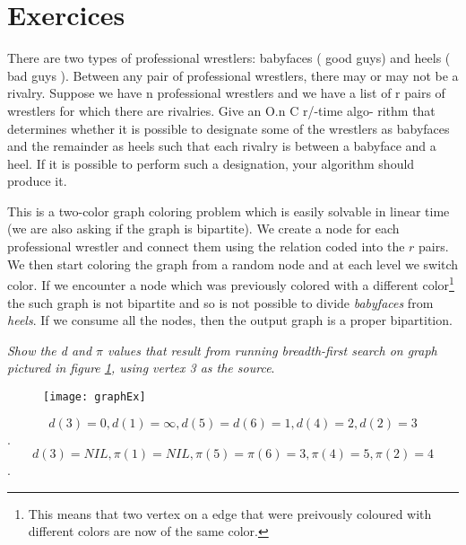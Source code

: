 \section{Exercices}
\begin{problem}
There are two types of professional wrestlers:  babyfaces  ( good guys) and
heels ( bad guys ). Between any pair of professional wrestlers, there may or
may not be a rivalry. Suppose we have n professional wrestlers and we have a list
of r pairs of wrestlers for which there are rivalries. Give an O.n C r/-time algo-
rithm that determines whether it is possible to designate some of the wrestlers as
babyfaces and the remainder as heels such that each rivalry is between a babyface
and a heel. If it is possible to perform such a designation, your algorithm should
produce it.
\begin{solution}
This is a two-color graph coloring problem which is easily solvable in linear time (we are also asking if the graph is bipartite).
We create a node for each professional wrestler and connect them using the relation coded into the $r$ pairs. We then start coloring the graph from a random node and at each level we switch color. If we encounter a node which was previously colored with a different color\footnote{This means that two vertex on a edge that were preivously coloured with different colors are now of the same color.} the such graph is not bipartite and so is not possible to divide \textit{babyfaces} from \textit{heels}. If we consume all the nodes, then the output graph is a proper bipartition.
\end{solution}


\end{problem}



\begin{problem}
\textit{Show the d and $\pi$ values that result from running breadth-first search on graph pictured in figure \ref{fig:graphex}, using vertex 3 as the source}.


	\begin{figure}
	\label{fig:graphex}
	\centering
		\texttt{[image: graphEx]}
	\end{figure}
\begin{solution}
\[d(3) = 0 , d(1) = \infty , d(5) = d(6) = 1 , d(4) = 2 ,d(2) = 3\].
\[d(3) = NIL , \pi(1) = NIL , \pi(5) = \pi(6) = 3 , \pi(4) = 5 ,\pi(2) = 4\].
	\end{solution}
\end{problem}


